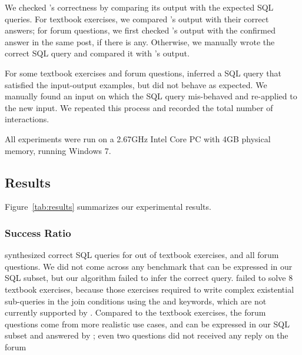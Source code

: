 We checked \ourtool's correctness by comparing its
output with the expected SQL queries.
For textbook exercises, we compared \ourtool's output with
their correct answers; for forum questions, we first
checked \ourtool's output with the confirmed answer
in the same post, if there is any. Otherwise, we
manually wrote the correct SQL query and
compared it with \ourtool's output.

For some textbook exercises and forum questions,
\ourtool inferred a SQL query that satisfied the input-output
examples, but did not behave as expected.
We manually found an input on which the
SQL query mis-behaved and re-applied \ourtool to the new input. We
repeated this process and recorded the total number of
interactions.


All experiments were run on a 2.67GHz Intel Core PC
with 4GB physical memory, running Windows 7.





\vspace{-2mm}
\subsection{Results}
\vspace{-1mm}

Figure~\ref{tab:results} summarizes our experimental results.

\subsubsection{Success Ratio}
\label{sec:ratio}


\ourtool synthesized correct SQL queries for \solexnum  out of
\exnum textbook exercises, and 
all \pnum forum questions.
We did not come across any benchmark
that can be expressed in our SQL subset,
but our algorithm failed to infer the correct query.
\ourtool failed to solve 8 textbook exercises,
because those exercises required to write
complex existential sub-queries in the join conditions
using the  and  keywords,
which are not currently supported by \ourtool.
Compared to the textbook exercises, the \pnum
forum questions come from more realistic use cases,
and can be expressed in our SQL subset
and answered by \ourtool; even 
two questions did not received any reply on the forum



